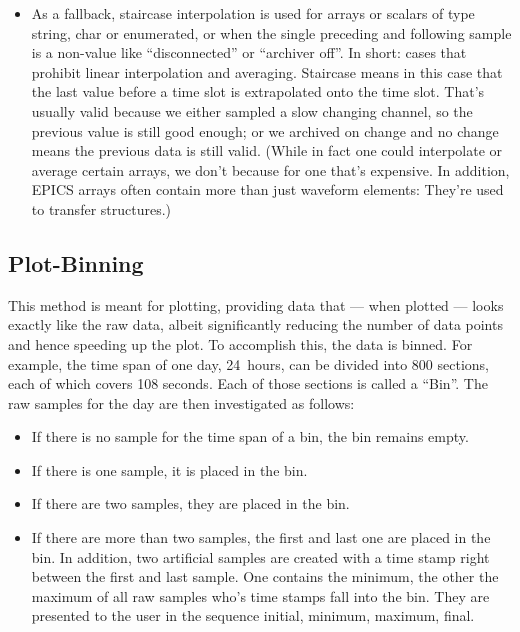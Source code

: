 \begin{itemize}
\item As a fallback, staircase interpolation is used for arrays or
  scalars of type string, char or enumerated, or when the single
  preceding and following sample is a non-value like ``disconnected''
  or ``archiver off''. In short: cases that prohibit linear
  interpolation and averaging.  Staircase means in this case that the
  last value before a time slot is extrapolated onto the time slot.
  That's usually valid because we either sampled a slow changing
  channel, so the previous value is still good enough; or we archived
  on change and no change means the previous data is still valid.
  (While in fact one could interpolate or average certain arrays, we
  don't because for one that's expensive. In addition, EPICS arrays
  often contain more than just waveform elements: They're
  used to transfer structures.)
\end{itemize}

\subsection{Plot-Binning} \label{sec:plotbinning}
This method is meant for plotting, providing data that --- when
plotted --- looks exactly like the raw data, albeit significantly
reducing the number of data points and hence speeding up the plot.  To
accomplish this, the data is binned. For example, the time span of one
day, 24~hours, can be divided into 800 sections, each of which covers 108
seconds. Each of those sections is called a ``Bin''. The raw samples
for the day are then investigated as follows:
\begin{itemize}
\item If there is no sample for the time span of a bin, the bin
  remains empty.
\item If there is one sample, it is placed in the bin.
\item If there are two samples, they are placed in the bin.
\item If there are more than two samples, the first and last one
  are placed in the bin. In addition, two artificial samples are
  created with a time stamp right between the first and last sample.
  One contains the minimum, the other the maximum of all raw samples
  who's time stamps fall into the bin. They are presented to the user
  in the sequence initial, minimum, maximum, final.
\end{itemize}

